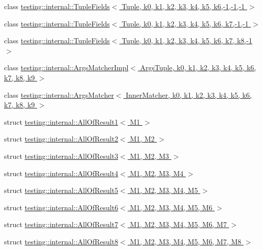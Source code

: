 \begin{DoxyCompactItemize}
\item 
class \hyperlink{classtesting_1_1internal_1_1_tuple_fields_3_01_tuple_00_01k0_00_01k1_00_01k2_00_01k3_00_01k4_00_deaa5da4e1bb5d2f3cddb0c4b1a35a07}{testing\+::internal\+::\+Tuple\+Fields$<$ Tuple, k0, k1, k2, k3, k4, k5, k6,-\/1,-\/1,-\/1 $>$}
\item 
class \hyperlink{classtesting_1_1internal_1_1_tuple_fields_3_01_tuple_00_01k0_00_01k1_00_01k2_00_01k3_00_01k4_00_0063f8a87602abfee3b4568185bc2c75}{testing\+::internal\+::\+Tuple\+Fields$<$ Tuple, k0, k1, k2, k3, k4, k5, k6, k7,-\/1,-\/1 $>$}
\item 
class \hyperlink{classtesting_1_1internal_1_1_tuple_fields_3_01_tuple_00_01k0_00_01k1_00_01k2_00_01k3_00_01k4_00_c1748b50f053abd55195ef8136fc372c}{testing\+::internal\+::\+Tuple\+Fields$<$ Tuple, k0, k1, k2, k3, k4, k5, k6, k7, k8,-\/1 $>$}
\item 
class \hyperlink{classtesting_1_1internal_1_1_args_matcher_impl}{testing\+::internal\+::\+Args\+Matcher\+Impl$<$ Args\+Tuple, k0, k1, k2, k3, k4, k5, k6, k7, k8, k9 $>$}
\item 
class \hyperlink{classtesting_1_1internal_1_1_args_matcher}{testing\+::internal\+::\+Args\+Matcher$<$ Inner\+Matcher, k0, k1, k2, k3, k4, k5, k6, k7, k8, k9 $>$}
\item 
struct \hyperlink{structtesting_1_1internal_1_1_all_of_result1}{testing\+::internal\+::\+All\+Of\+Result1$<$ M1 $>$}
\item 
struct \hyperlink{structtesting_1_1internal_1_1_all_of_result2}{testing\+::internal\+::\+All\+Of\+Result2$<$ M1, M2 $>$}
\item 
struct \hyperlink{structtesting_1_1internal_1_1_all_of_result3}{testing\+::internal\+::\+All\+Of\+Result3$<$ M1, M2, M3 $>$}
\item 
struct \hyperlink{structtesting_1_1internal_1_1_all_of_result4}{testing\+::internal\+::\+All\+Of\+Result4$<$ M1, M2, M3, M4 $>$}
\item 
struct \hyperlink{structtesting_1_1internal_1_1_all_of_result5}{testing\+::internal\+::\+All\+Of\+Result5$<$ M1, M2, M3, M4, M5 $>$}
\item 
struct \hyperlink{structtesting_1_1internal_1_1_all_of_result6}{testing\+::internal\+::\+All\+Of\+Result6$<$ M1, M2, M3, M4, M5, M6 $>$}
\item 
struct \hyperlink{structtesting_1_1internal_1_1_all_of_result7}{testing\+::internal\+::\+All\+Of\+Result7$<$ M1, M2, M3, M4, M5, M6, M7 $>$}
\item 
struct \hyperlink{structtesting_1_1internal_1_1_all_of_result8}{testing\+::internal\+::\+All\+Of\+Result8$<$ M1, M2, M3, M4, M5, M6, M7, M8 $>$}

\end{DoxyCompactItemize}
